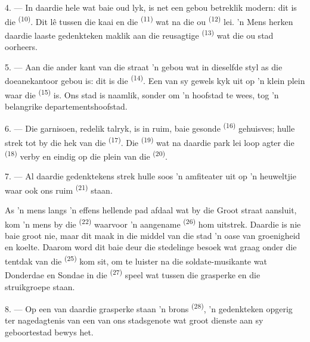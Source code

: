 4. --- In daardie hele  wat baie oud lyk, is net een gebou betreklik modern:
dit is die  \textsuperscript{(10)}. Dit lê tussen die kaai en die
 \textsuperscript{(11)} wat na die ou 
\textsuperscript{(12)} lei. 'n Mens herken daardie laaste gedenkteken maklik aan die
reusagtige  \textsuperscript{(13)} wat die ou stad oorheers.

5. --- Aan die ander kant van die straat  'n gebou wat in dieselfde styl as
die doeanekantoor gebou is: dit is die  \textsuperscript{(14)}. Een van sy
gewels kyk uit op 'n klein plein waar die  \textsuperscript{(15)}
is. Ons stad is naamlik, sonder om 'n hoofstad te wees, tog 'n belangrike
departementshoofstad.

\VUsaut{5.0mm}
\VUsaut{3.4mm}

6. --- Die garnisoen, redelik talryk, is in ruim, baie gesonde 
\textsuperscript{(16)} gehuisves; hulle strek tot by die hek van die 
\textsuperscript{(17)}. Die  \textsuperscript{(19)} wat na daardie park
lei loop agter die  \textsuperscript{(18)} verby en eindig op die plein
van die  \textsuperscript{(20)}.

7. --- Al daardie gedenktekens strek hulle soos 'n amfiteater uit op 'n heuweltjie waar
ook ons ruim  \textsuperscript{(21)} staan.

As 'n mens langs 'n effens hellende pad afdaal wat by die Groot straat aansluit, kom 'n
mens by die  \textsuperscript{(22)} waarvoor 'n aangename
 \textsuperscript{(26)} hom uitstrek. Daardie  is
nie baie groot nie, maar dit maak in die middel van die stad 'n oase van groenigheid en
koelte. Daarom word dit baie deur die stedelinge besoek wat graag onder die tentdak van
die  \textsuperscript{(25)} kom sit, om te luister na die soldate-musikante
wat Donderdae en Sondae in die  \textsuperscript{(27)} speel wat tussen die
grasperke en die struikgroepe staan.

8. --- Op een van daardie grasperke staan 'n brons 
\textsuperscript{(28)}, 'n gedenkteken opgerig ter nagedagtenis van een van ons
stadsgenote wat groot dienste aan sy geboortestad bewys het.

